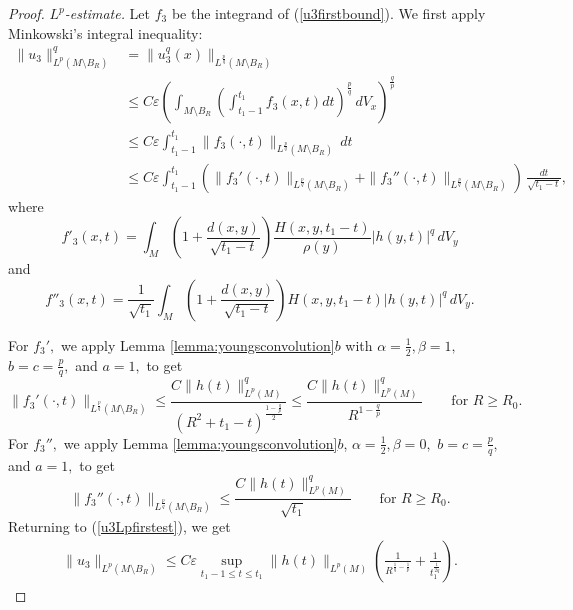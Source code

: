 \documentclass[12pt]{amsart}
\renewcommand{\1}{{\mathbf 1}}
\newcommand{\eps}{{\varepsilon}}
\theoremstyle{others}
\numberwithin{equation}{section}
\begin{document}
\begin{proof}
    \noindent \emph{$L^p$-estimate.} Let $f_3$ be the integrand of (\ref{u3firstbound}).
     We first apply Minkowski's integral inequality:
     \begin{equation}\label{u3Lpfirstest}
     \begin{split}
        \| u_3\|^q_{L^{p}(M \setminus B_R)} 
        &= \| u_3^q(x) \|_{L^{\frac{p}{q}}(M \setminus B_R)} \\
        & \leq C \eps \left( \int_{M \setminus B_R} \left( \int_{t_1 - 1}^{t_1} f_3(x,t) dt \right)^{\frac{p}{q}} \, dV_x \right)^{\frac{q}{p}} \\
        & \leq C \eps \int_{t_1 - 1}^{t_1} \|f_3(\cdot, t) \|_{L^{\frac{p}{q}}(M \setminus B_R)} \, dt \\
        & \leq C \eps \int_{t_1 - 1}^{t_1} \left( \|f_3'(\cdot, t) \|_{L^{\frac{p}{q}}(M \setminus B_R)} + \|f_3''(\cdot, t) \|_{L^{\frac{p}{q}}(M \setminus B_R)} \right) \, \frac{dt}{\sqrt{t_1 - t} },
        \end{split}
    \end{equation}
    where
         $$f'_3(x,t) =  \int_M \left( 1 + \frac{d(x,y) }{ \sqrt{t_1 - t} } \right)\frac{H(x,y,t_1 - t) }{ \rho(y) } |h(y,t)|^q \, dV_y$$
     and
     $$f''_3(x,t) = \frac{1}{\sqrt{t_1}} \int_M \left( 1 + \frac{d(x,y) }{ \sqrt{t_1 - t} } \right) H(x,y,t_1 - t)  |h(y,t)|^q \, dV_y.$$

    For $f_3',$ we apply Lemma \ref{lemma:youngsconvolution}$b$ with $\alpha = \frac12, \beta = 1,$ $b = c = \frac{p}{q},$ and $a = 1,$ to get
    $$\|f_3'(\cdot, t) \|_{L^{\frac{p}{q}}(M \setminus B_R)} \leq \frac{C \|h(t) \|_{L^p(M)}^q }{ \left( R^2 + t_1 -t \right)^{ \frac{1 - \frac{q}{p}}{2} } } \leq  \frac{C \|h(t) \|_{L^p(M)}^q }{ R^{1 - \frac{q}{p} } } \qquad {\text{for } R \ge R_0}.$$
    For $f_3'',$ we apply Lemma \ref{lemma:youngsconvolution}$b$, $\alpha = \frac12, \beta = 0,$ $b = c = \frac{p}{q},$ and $a = 1,$ to get
    $$\|f_3''(\cdot, t) \|_{L^{\frac{p}{q}}(M \setminus B_R)} \leq \frac{C \|h(t) \|_{L^p(M)}^q }{ \sqrt{t_1} } \qquad {\text{for } R \ge R_0}.$$
    Returning to (\ref{u3Lpfirstest}), we get
   \begin{equation}\label{u3Lpest}
       \begin{split}
           \| u_3 \|_{L^{p}(M \setminus B_R)} \leq C \eps \sup_{t_1 - 1 \leq t \leq t_1} \|h(t) \|_{L^p(M)} \left( \frac{1}{R^{\frac{1}{q} - \frac{1}{p} }} + \frac{1}{t_1^{\frac{1}{2q}} } \right).
       \end{split}
   \end{equation}



\end{proof}
\end{document}
